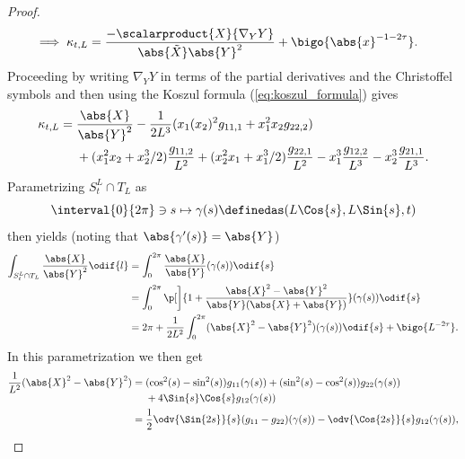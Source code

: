 \documentclass[titlepage,numbers=noenddot,oneside,%
cleardoublepage=empty,paper=a4,fontsize=11pt,%
english,%
]{scrartcl}
\begin{document}
\begin{proof}
\begin{align*}
        \implies \kappa_{t,L}&=\frac{-\scalarproduct{X}{\nabla_Y Y}}{\abs{\tilde{X}}\abs{Y}^2}+\bigo{\abs{x}^{-1-2\tau}}.
    \end{align*}
    Proceeding by writing \( \nabla_Y Y \) in terms of the partial derivatives and the Christoffel symbols and then using the Koszul formula (\cref{eq:koszul_formula}) gives
    \begin{equation}
        \kappa_{t,L}=\begin{aligned}[t]
            &\frac{\abs{X}}{\abs{Y}^2}-\frac{1}{2L^3}(x_1(x_2)^2 g_{11,1}+x_1^2 x_2 g_{22,2})\\
            &+(x_1^2 x_2+x_2^3/2)\frac{g_{11,2}}{L^2}+(x_2^2 x_1+x_1^3/2)\frac{g_{22,1}}{L^2}-x_1^3 \frac{g_{12,2}}{L^3}-x_2^3\frac{g_{21,1}}{L^3}.
        \end{aligned}\label{eq:geodesic_curvature_asymptotic}
    \end{equation}
    Parametrizing \( S_t^L\cap T_L \) as
    \begin{equation*}
        \interval{0}{2\pi}\ni s\mapsto \gamma(s)\definedas (L\Cos{s},L\Sin{s},t)
    \end{equation*}
    then yields (noting that \( \abs{\gamma'(s)}=\abs{Y} \))
    \begin{equation*}
        \begin{aligned}[t]
            \int_{S_t^L\cap T_L}\frac{\abs{X}}{\abs{Y}^2}\odif{l}&=\int_{0}^{2\pi}\frac{\abs{X}}{\abs{Y}}(\gamma(s))\odif{s}\\
            &=\int_0^{2\pi}\p[\bigg]{1+\frac{\abs{X}^2-\abs{Y}^2}{\abs{Y}(\abs{X}+\abs{Y})}}(\gamma(s))\odif{s}\\
            &=2\pi+\frac{1}{2L^2}\int_0^{2\pi}(\abs{X}^2-\abs{Y}^2)(\gamma(s))\odif{s}+\bigo{L^{-2\tau}}.
        \end{aligned}
    \end{equation*}
    In this parametrization we then get
    \begin{equation*}
        \begin{aligned}[t]
            \frac{1}{L^2}(\abs{X}^2-\abs{Y}^2)&=\begin{aligned}[t]
                &(\cos^2(s)-\sin^2(s))g_{11}(\gamma(s))+(\sin^2(s)-\cos^2(s))g_{22}(\gamma(s))\\
                &+4\Sin{s}\Cos{s}g_{12}(\gamma(s))
            \end{aligned}\\
            &=\frac{1}{2}\odv{\Sin{2s}}{s}(g_{11}-g_{22})(\gamma(s))-\odv{\Cos{2s}}{s}g_{12}(\gamma(s)),
        \end{aligned}

\end{equation*}
\end{proof}
\end{document}
